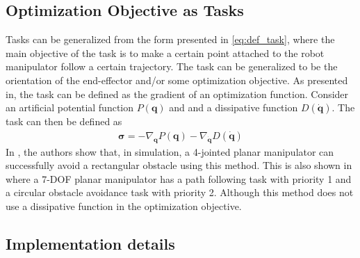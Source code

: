 \subsection{Optimization Objective as Tasks}

Tasks can be generalized from the form presented in \autoref{eq:def_task}, where
the main objective of the task is to make a certain point attached to the robot
manipulator follow a certain trajectory. The task can be generalized to be the
orientation of the end-effector and/or some optimization objective. As presented
in\cite{nakamura1987}, the task can be defined as the gradient of an optimization
function. Consider an artificial potential function $P(\bm{q})$ and and a dissipative function
$D(\dot{\bm{q}})$. The task can then be defined as
\begin{align}
    \bm{\sigma} = -\nabla_{\bm{q}} P(\bm{q}) - \nabla_{\dot{\bm{q}}}D(\dot{\bm{q}})
\end{align}
In \cite{nakamura1987}, the authors show that, in simulation, a 4-jointed planar
manipulator can successfully avoid a rectangular obstacle using this method. This is
also shown in \cite{siciliano1991} where a 7-DOF planar manipulator has a path
following task with priority 1 and a circular obstacle avoidance task with priority 2.
Although this method does not use a dissipative function in the optimization objective.

\subsection{Implementation details}

